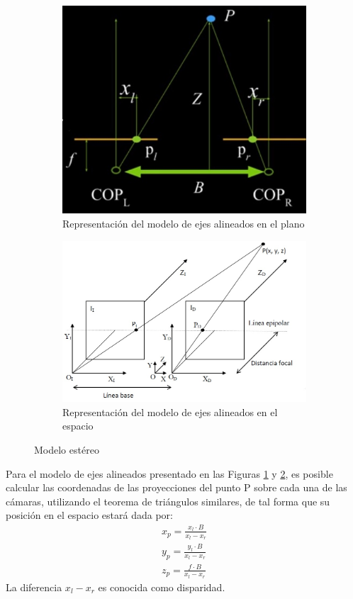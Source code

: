 \begin{figure}[H]
     \centering
     \begin{subfigure}[b]{0.4\textwidth}
        \centering
        \includegraphics[scale=0.5]{Recursos/stereoGeometry.jpg}
        \caption{Representación del modelo de ejes alineados en el plano}
        \label{estereoSystemParallel}
     \end{subfigure}
     \hfill
     \begin{subfigure}[b]{0.4\textwidth}
         \centering
        \includegraphics[scale=0.3]{Recursos/stereoGeometry3D.jpg}
        \caption{Representación del modelo de ejes alineados en el espacio}
        \label{estereoSystemParallel3D}
     \end{subfigure}
     \hfill
\caption{Modelo estéreo}
\label{stereoMODEL}
\end{figure}
Para el modelo de ejes alineados presentado en las Figuras \ref{estereoSystemParallel} y \ref{estereoSystemParallel3D}, es posible calcular las coordenadas de las proyecciones del punto P sobre cada una de las cámaras, utilizando el teorema de triángulos similares, de tal forma que su posición en el espacio estará dada por: 
\begin{align}
x_{p} = \frac{x_{l}\cdot B}{x_{l} - x_{r}}\\
y_{p} = \frac{y_{l}\cdot B}{x_{l} - x_{r}}\\
z_{p} = \frac{f\cdot B}{x_{l} - x_{r}}
\end{align}
La diferencia $x_{l} - x_{r}$ es conocida como disparidad.
